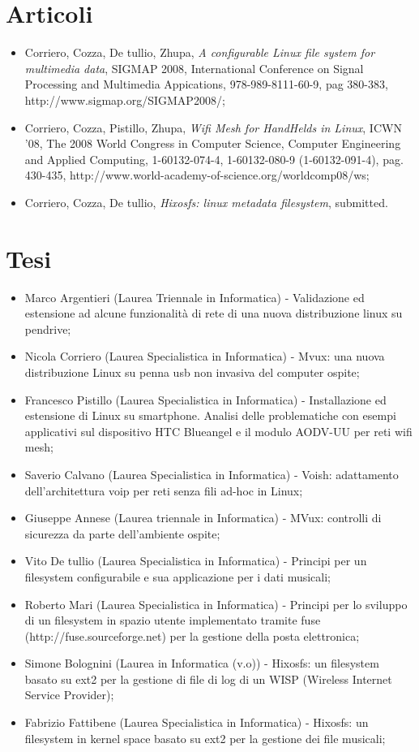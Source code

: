 \documentclass[a4paper,12pt]{article}
\renewcommand{\aa }{\`{a} }
\begin{document}
\section*{Articoli}
\begin{itemize}
\item Corriero, Cozza, De tullio, Zhupa, \textit{A configurable Linux file system for multimedia data}, SIGMAP 2008, International Conference on Signal Processing and Multimedia Appications, 978-989-8111-60-9, pag 380-383, \\http://www.sigmap.org/SIGMAP2008/;
\item Corriero, Cozza, Pistillo, Zhupa, \textit{Wifi Mesh for HandHelds in Linux}, ICWN '08, The 2008 World Congress in Computer Science, Computer Engineering and Applied Computing, 1-60132-074-4, 1-60132-080-9 (1-60132-091-4), pag. 430-435, http://www.world-academy-of-science.org/worldcomp08/ws;
\item Corriero, Cozza, De tullio, \textit{Hixosfs: linux metadata filesystem}, submitted.
\end{itemize}


\section*{Tesi}
\begin{itemize}
\item Marco Argentieri (Laurea Triennale in Informatica) - Validazione ed estensione ad alcune funzionalit\aa di rete di una nuova distribuzione linux su pendrive;
\item Nicola Corriero (Laurea Specialistica in Informatica) - Mvux: una nuova distribuzione Linux su penna usb non invasiva del computer ospite;
\item Francesco Pistillo (Laurea Specialistica in Informatica) - Installazione ed estensione di Linux su smartphone. Analisi delle problematiche con esempi applicativi sul dispositivo HTC Blueangel e il modulo AODV-UU per reti wifi mesh;
\item Saverio Calvano (Laurea Specialistica in Informatica) - Voish: adattamento dell'architettura voip per reti senza fili ad-hoc in Linux;
 \item Giuseppe Annese (Laurea triennale in Informatica) - MVux: controlli di sicurezza da parte dell'ambiente ospite;
\item Vito De tullio (Laurea Specialistica in Informatica) - Principi per un filesystem configurabile e sua applicazione per i dati musicali;
\item Roberto Mari (Laurea Specialistica in Informatica) - Principi per lo sviluppo di un filesystem in spazio utente implementato tramite fuse \\(http://fuse.sourceforge.net) per la gestione della posta elettronica;
\item Simone Bolognini (Laurea in Informatica  (v.o)) - Hixosfs: un filesystem basato su ext2 per la gestione di file di log di un WISP (Wireless Internet Service Provider);
\item Fabrizio Fattibene (Laurea Specialistica in Informatica) - Hixosfs: un filesystem in kernel space basato su ext2 per la gestione dei file musicali;
\end{itemize}
\end{document}
